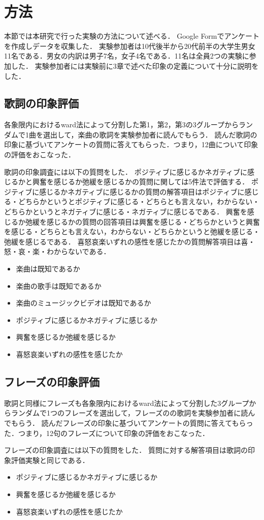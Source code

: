 \section{方法}
本節では本研究で行った実験の方法について述べる．
Google Formでアンケートを作成しデータを収集した．
実験参加者は10代後半から20代前半の大学生男女11名である．男女の内訳は男子7名，女子4名である．11名は全員2つの実験に参加した．
実験参加者には実験前に3章で述べた印象の定義について十分に説明をした．

\subsection{歌詞の印象評価}

各象限内におけるward法によって分割した第1，第2，第3の3グループからランダムで1曲を選出して，楽曲の歌詞を実験参加者に読んでもらう．
読んだ歌詞の印象に基づいてアンケートの質問に答えてもらった．つまり，12曲について印象の評価をおこなった．

歌詞の印象調査には以下の質問をした．
ポジティブに感じるかネガティブに感じるかと興奮を感じるか弛緩を感じるかの質問に関しては5件法で評価する．
ポジティブに感じるかネガティブに感じるかの質問の解答項目はポジティブに感じる・どちらかというとポジティブに感じる・どちらとも言えない，わからない・どちらかというとネガティブに感じる・ネガティブに感じるである．
興奮を感じるか弛緩を感じるかの質問の回答項目は興奮を感じる・どちらかというと興奮を感じる・どちらとも言えない，わからない・どちらかというと弛緩を感じる・弛緩を感じるである．
喜怒哀楽いずれの感性を感じたかの質問解答項目は喜・怒・哀・楽・わからないである．

\begin{itemize}
      \item 楽曲は既知であるか
      \item 楽曲の歌手は既知であるか
      \item 楽曲のミュージックビデオは既知であるか
      \item ポジティブに感じるかネガティブに感じるか
      \item 興奮を感じるか弛緩を感じるか
      \item 喜怒哀楽いずれの感性を感じたか
\end{itemize}

\subsection{フレーズの印象評価}
歌詞と同様にフレーズも各象限内におけるward法によって分割した3グループからランダムで1つのフレーズを選出して，フレーズのの歌詞を実験参加者に読んでもらう．
読んだフレーズの印象に基づいてアンケートの質問に答えてもらった．つまり，12句のフレーズについて印象の評価をおこなった．

フレーズの印象調査には以下の質問をした．
質問に対する解答項目は歌詞の印象評価実験と同じである．
\begin{itemize}
      \item ポジティブに感じるかネガティブに感じるか
      \item 興奮を感じるか弛緩を感じるか
      \item 喜怒哀楽いずれの感性を感じたか
\end{itemize}